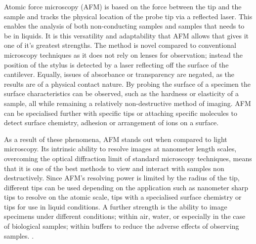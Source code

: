 Atomic force microscopy (AFM) is based on the force between the tip and the sample and tracks the physical location of the probe tip via a reflected laser. This enables the analysis of both non-conducting samples and samples that needs to be in liquids. It is this versatility and adaptability that AFM allows that gives it one of it's greatest strengths. The method is novel compared to conventional microscopy techniques as it does not rely on lenses for observation; instead the position of the stylus is detected by a laser reflecting off the surface of the cantilever. Equally, issues of absorbance or transparency are negated, as the results are of a physical contact nature. By probing the surface of a specimen the surface characteristics can be observed, such as the hardness or elasticity of a sample, all while remaining a relatively non-destructive method of imaging. AFM can be specialised further with specific tips or attaching specific molecules to detect surface chemistry, adhesion or arrangement of ions on a surface\cite{KislonAfm}. 


As a result of these phenomena, AFM stands out when compared to light microscopy. Its intrinsic ability to resolve images at nanometer length scales, overcoming the optical diffraction limit of standard microscopy techniques, means that it is one of the best methods to view and interact with samples non destructively. Since AFM's resolving power is limited by the radius of the tip, different tips can be used depending on the application such as nanometer sharp tips to resolve on the atomic scale, tips with a specialised surface chemistry or tips for use in liquid conditions. A further strength is the ability to image specimens under different conditions; within air, water, or especially in the case of biological samples; within buffers to reduce the adverse effects of observing samples. \cite{WetAFM}. 

